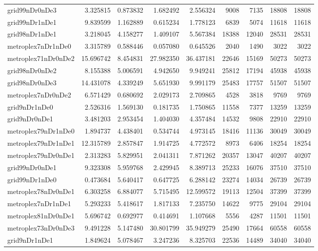 \begin{longtable}{|l|r|r|r|r|r|r|r|r|}
grid99nDr0nDe3 & 3.325815 & 0.873832 & 1.682492 & 2.556324 & 9008 & 7135 & 18808 & 18808 \\
grid99nDr1nDe1 & 9.839599 & 1.162889 & 0.615234 & 1.778123 & 6839 & 5074 & 11618 & 11618 \\
grid98nDr1nDe1 & 3.218045 & 4.158277 & 1.409107 & 5.567384 & 18388 & 12040 & 28531 & 28531 \\
metroplex7nDr1nDe0 & 3.315789 & 0.588446 & 0.057080 & 0.645526 & 2040 & 1490 & 3022 & 3022 \\
metroplex71nDr0nDe2 & 15.696742 & 8.454831 & 27.982350 & 36.437181 & 22646 & 15169 & 50273 & 50273 \\
grid98nDr0nDe2 & 8.155388 & 5.006591 & 4.942650 & 9.949241 & 25812 & 17194 & 45938 & 45938 \\
grid98nDr0nDe3 & 14.431078 & 4.339249 & 5.651930 & 9.991179 & 25483 & 17757 & 51507 & 51507 \\
metroplex7nDr0nDe2 & 6.571429 & 0.680692 & 2.029173 & 2.709865 & 4528 & 3818 & 9769 & 9769 \\
grid9nDr1nDe0 & 2.526316 & 1.569130 & 0.181735 & 1.750865 & 11558 & 7377 & 13259 & 13259 \\
grid9nDr0nDe1 & 3.481203 & 2.953454 & 1.404030 & 4.357484 & 14532 & 9808 & 22910 & 22910 \\
metroplex79nDr1nDe0 & 1.894737 & 4.438401 & 0.534744 & 4.973145 & 18416 & 11136 & 30049 & 30049 \\
metroplex79nDr1nDe1 & 12.315789 & 2.857847 & 1.914725 & 4.772572 & 8973 & 6406 & 18254 & 18254 \\
metroplex79nDr0nDe1 & 2.313283 & 5.829951 & 2.041311 & 7.871262 & 20357 & 13047 & 40207 & 40207 \\
grid99nDr0nDe1 & 9.323308 & 5.959768 & 2.429945 & 8.389713 & 25233 & 16076 & 37510 & 37510 \\
grid99nDr1nDe0 & 0.473684 & 5.640417 & 0.647725 & 6.288142 & 23274 & 14034 & 26739 & 26739 \\
metroplex78nDr0nDe1 & 6.303258 & 6.884077 & 5.715495 & 12.599572 & 19113 & 12504 & 37399 & 37399 \\
metroplex7nDr1nDe1 & 5.293233 & 5.418617 & 1.817133 & 7.235750 & 14622 & 9775 & 29104 & 29104 \\
metroplex81nDr0nDe1 & 5.696742 & 0.692977 & 0.414691 & 1.107668 & 5556 & 4287 & 11501 & 11501 \\
metroplex73nDr0nDe3 & 9.491228 & 5.147480 & 30.801799 & 35.949279 & 25490 & 17664 & 60558 & 60558 \\
grid9nDr1nDe1 & 1.849624 & 5.078467 & 3.247236 & 8.325703 & 22536 & 14489 & 34040 & 34040 \\

\end{longtable}
